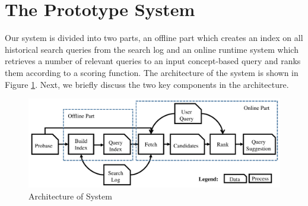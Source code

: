 \section{The Prototype System}\label{sec:framework}
%

Our system is divided into two parts, an offline part which creates an index on
all historical search queries from the search log and an online runtime system
which retrieves a number of relevant queries to an input concept-based query
and ranks them according to a scoring function. The architecture of the system
is shown in Figure \ref{fig:overall-structure}.
Next, we briefly discuss the two key components in the architecture.

%
\begin{figure} [th]
  \centering
  \includegraphics[width=0.8\columnwidth]{images/architecture}
  \caption{Architecture of System}
  \label{fig:overall-structure}
\end{figure}

